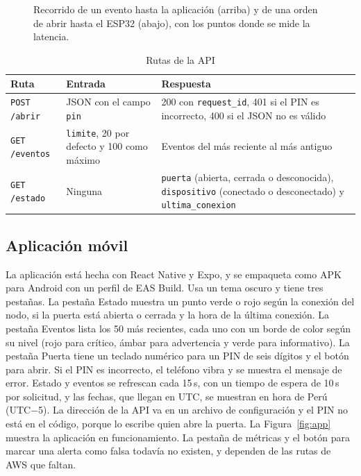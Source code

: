 \documentclass[manuscript,screen,nonacm]{acmart}
\begin{document}
\begin{figure}[htbp]
\centering
{}
\caption{Recorrido de un evento hasta la aplicación (arriba) y de una orden de abrir hasta el ESP32 (abajo), con los puntos donde se mide la latencia.}
\label{fig:secuencia}
\end{figure}

\begin{table}[htbp]
\centering
\caption{Rutas de la API}
\label{tab:api}
\footnotesize
\renewcommand{\arraystretch}{1.15}
\begin{tabular}{@{}L{2.6cm}L{4.3cm}L{6.1cm}@{}}
\toprule
\textbf{Ruta} & \textbf{Entrada} & \textbf{Respuesta} \\
\midrule
\texttt{POST /abrir} & JSON con el campo \texttt{pin} & 200 con \texttt{request\_id}, 401 si el PIN es incorrecto, 400 si el JSON no es válido \\
\texttt{GET /eventos} & \texttt{limite}, 20 por defecto y 100 como máximo & Eventos del más reciente al más antiguo \\
\texttt{GET /estado} & Ninguna & \texttt{puerta} (abierta, cerrada o desconocida), \texttt{dispositivo} (conectado o desconectado) y \texttt{ultima\_conexion} \\
\bottomrule
\end{tabular}
\end{table}

\subsection{Aplicación móvil}
\label{sec:app}
La aplicación está hecha con React Native y Expo, y se empaqueta como APK para Android con un perfil de EAS Build. Usa un tema oscuro y tiene tres pestañas. La pestaña Estado muestra un punto verde o rojo según la conexión del nodo, si la puerta está abierta o cerrada y la hora de la última conexión. La pestaña Eventos lista los 50 más recientes, cada uno con un borde de color según su nivel (rojo para crítico, ámbar para advertencia y verde para informativo). La pestaña Puerta tiene un teclado numérico para un PIN de seis dígitos y el botón para abrir. Si el PIN es incorrecto, el teléfono vibra y se muestra el mensaje de error. Estado y eventos se refrescan cada 15\,s, con un tiempo de espera de 10\,s por solicitud, y las fechas, que llegan en UTC, se muestran en hora de Perú (UTC$-$5). La dirección de la API va en un archivo de configuración y el PIN no está en el código, porque lo escribe quien abre la puerta. La Figura~\ref{fig:app} muestra la aplicación en funcionamiento. La pestaña de métricas y el botón para marcar una alerta como falsa todavía no existen, y dependen de las rutas de AWS que faltan.
\end{document}
